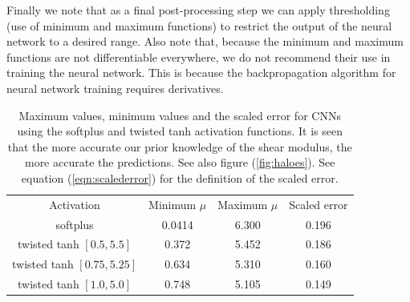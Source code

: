 \documentclass[12pt]{article}
\begin{document}
Finally we note that as a final post-processing step we can apply thresholding (use of minimum and maximum functions) to restrict the output of the neural network to a desired range. Also note that, because the minimum and maximum functions are not differentiable everywhere, we do not recommend their use in training the neural network. This is because the backpropagation algorithm for neural network training requires derivatives.
\begin{table}
  \centering
  \begin{tabular}{|c|c|c|c|}
    \hline
    \multirow{2}{*}{Activation}  & \multirow{2}{*}{Minimum $\mu$} & \multirow{2}{*}{Maximum $\mu$} & \multirow{2}{*}{Scaled error}\\
                                 &                                &                                &              \\
    \hline
    softplus                 & 0.0414       & 6.300            & 0.196\\
    \hline
    twisted tanh $[0.5, 5.5]$  & 0.372        & 5.452          & 0.186\\     
    \hline
    twisted tanh $[0.75,5.25]$ & 0.634        & 5.310          & 0.160\\
    \hline
    twisted tanh $[1.0, 5.0]$  & 0.748        & 5.105          & 0.149\\
    \hline
  \end{tabular}
  \caption{\label{table:muminmax} Maximum values, minimum values and the scaled error for CNNs using the softplus and twisted tanh activation functions. It is seen that the more accurate our prior knowledge of the shear modulus, the more accurate the predictions. See also figure (\ref{fig:haloes}). See equation (\ref{eqn:scalederror}) for the definition of the scaled error.}
\end{table}
\end{document}
